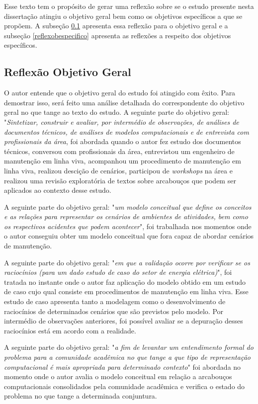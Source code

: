Esse texto tem o propósito de gerar uma reflexão sobre se o estudo presente nesta dissertação atingiu o objetivo geral bem como os objetivos específicos a que se propõem. A subseção \ref{reflexobgeral} apresenta essa reflexão para o objetivo geral e a subseção \ref{reflexobespecifico} apresenta as reflexões a respeito dos objetivos específicos.

\subsection{Reflexão Objetivo Geral}\label{reflexobgeral}

O autor entende que o objetivo geral do estudo foi atingido com êxito. Para demostrar isso, será feito uma análise detalhada do correspondente do objetivo geral no que tange ao texto do estudo. A seguinte parte do objetivo geral: "\textit{Sintetizar, construir e avaliar, por intermédio de observações, de análises de documentos técnicos, de análises de modelos computacionais e de entrevista com profissionais da área}, foi abordada quando o autor fez estudo dos documentos técnicos, conversou com profissionais da área, entrevistou um engenheiro de manutenção em linha viva, acompanhou um procedimento de manutenção em linha viva, realizou descição de cenários, participou de \textit{workshops} na área e realizou uma revisão exploratória de textos sobre arcabouços que podem ser aplicados ao contexto desse estudo. 

A seguinte parte do objetivo geral: "\textit{um modelo conceitual que define os conceitos e as relações para representar os cenários de ambientes de atividades, bem como os respectivos acidentes que podem acontecer}", foi trabalhada nos momentos onde o autor conseguiu obter um modelo conceitual que fora capaz de abordar cenários de manutenção. 

A seguinte parte do objetivo geral: "\textit{em que a validação ocorre por verificar se os raciocínios (para um dado estudo de caso do setor de energia elétrica)}", foi tratada no instante onde o autor faz aplicação do modelo obtido em um estudo de caso cujo qual consiste em procedimentos de manutenção em linha viva. Esse estudo de caso apresenta tanto a modelagem como o desenvolvimento de raciocínios de determinados cenários que são previstos pelo modelo. Por intermédio de observações anteriores, foi possível avaliar se a depuração desses raciocínios está em acordo com a realidade.  

A seguinte parte do objetivo geral: "\textit{a fim de levantar um entendimento formal do problema para a comunidade acadêmica no que tange a que tipo de representação computacional é mais apropriada para determinado contexto}" foi abordada no momento onde o autor avalia o modelo conceitual em relação a arcabouços computacionais consolidados pela comunidade acadêmica e verifica o estado do problema no que tange a determinada conjuntura. 

